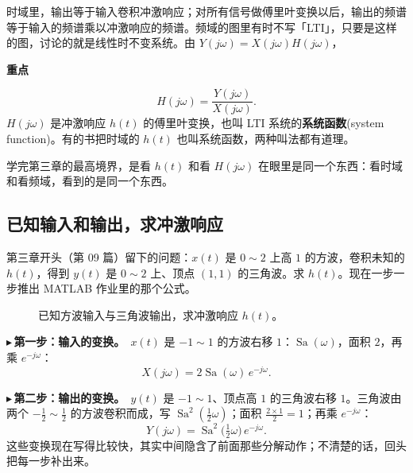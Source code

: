 \documentclass[UTF8,a4paper,11pt]{ctexart}
\newcommand{\Sa}{\operatorname{Sa}}
\newenvironment{remember}{\begin{rememberbox}\textbf{重点}\par\smallskip}{\end{rememberbox}}
\newcommand{\taxes}[5][t]{%
  \draw[->] (#2,0) -- (#3,0) node[right,font=\scriptsize] {$#1$};
  \draw[->] (0,#5) -- (0,#4);
  \node[anchor=north east,font=\tiny,gray!60!black,inner sep=1pt] at (0,-0.02) {$0$};}
\newcommand{\xt}[2]{\draw (#1,0) -- (#1,-0.1) node[anchor=north,font=\tiny,gray!60!black,fill=white,inner sep=0.6pt] {$#2$};}
\newcommand{\yt}[2]{\draw (0,#1) -- (-0.1,#1) node[anchor=east,font=\tiny,gray!60!black,fill=white,inner sep=0.6pt] {$#2$};}
\newcommand{\rectp}[4][sig]{\draw[#1] (#2,0) -- (#2,#4) -- (#3,#4) -- (#3,0);}
\newcommand{\trip}[5][sig]{\draw[#1] (#2,0) -- (#3,#5) -- (#4,0);}
\newcounter{ex}[section]
\newcommand{\point}[1]{\par\addvspace{1ex}\noindent\textcolor{ptteal}{$\blacktriangleright$\,\textbf{#1}}\ }
\begin{document}
时域里，输出等于输入卷积冲激响应；对所有信号做傅里叶变换以后，输出的频谱等于输入的频谱乘以冲激响应的频谱。频域的图里有时不写「LTI」，只要是这样的图，讨论的就是线性时不变系统。由 $Y(j\omega)=X(j\omega)H(j\omega)$，
\begin{remember}
\[
H(j\omega)=\frac{Y(j\omega)}{X(j\omega)} .
\]
$H(j\omega)$ 是冲激响应 $h(t)$ 的傅里叶变换，也叫 LTI 系统的\textbf{系统函数}(system function)。有的书把时域的 $h(t)$ 也叫系统函数，两种叫法都有道理。

学完第三章的最高境界，是看 $h(t)$ 和看 $H(j\omega)$ 在眼里是同一个东西：看时域和看频域，看到的是同一个东西。
\end{remember}

\subsection{已知输入和输出，求冲激响应}\label{sub:findh}
第三章开头（第 09 篇）留下的问题：$x(t)$ 是 $0\sim2$ 上高 $1$ 的方波，卷积未知的 $h(t)$，得到 $y(t)$ 是 $0\sim2$ 上、顶点 $(1,1)$ 的三角波。求 $h(t)$。现在一步一步推出 MATLAB 作业里的那个公式。

\begin{figure}[H]
\centering
{}
\caption{已知方波输入与三角波输出，求冲激响应 $h(t)$。}
\label{fig:findh}
\end{figure}

\point{第一步：输入的变换。}$x(t)$ 是 $-1\sim1$ 的方波右移 $1$：$\Sa(\omega)$，面积 $2$，再乘 $e^{-j\omega}$：
\[
X(j\omega)=2\Sa(\omega)\,e^{-j\omega}.
\]
\point{第二步：输出的变换。}$y(t)$ 是 $-1\sim1$、顶点高 $1$ 的三角波右移 $1$。三角波由两个 $-\frac12\sim\frac12$ 的方波卷积而成，写 $\Sa^2(\frac12\omega)$；面积 $\frac{2\times1}{2}=1$；再乘 $e^{-j\omega}$：
\[
Y(j\omega)=\Sa^2\big(\tfrac12\omega\big)\,e^{-j\omega}.
\]
这些变换现在写得比较快，其实中间隐含了前面那些分解动作；不清楚的话，回头把每一步补出来。
\end{document}

